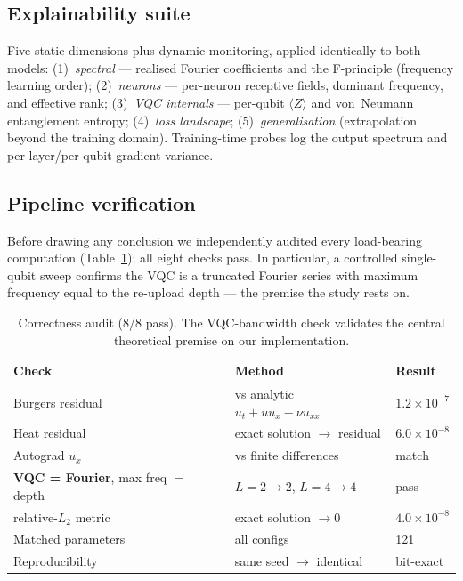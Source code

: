 \documentclass[11pt]{article}
\begin{document}
\subsection{Explainability suite}
Five static dimensions plus dynamic monitoring, applied identically to both models:
(1)~\emph{spectral} --- realised Fourier coefficients and the F-principle
(frequency learning order); (2)~\emph{neurons} --- per-neuron receptive fields,
dominant frequency, and effective rank; (3)~\emph{VQC internals} --- per-qubit
$\langle Z\rangle$ and von~Neumann entanglement entropy; (4)~\emph{loss landscape};
(5)~\emph{generalisation} (extrapolation beyond the training domain). Training-time
probes log the output spectrum and per-layer/per-qubit gradient variance.

\subsection{Pipeline verification}
Before drawing any conclusion we independently audited every load-bearing
computation (Table~\ref{tab:verify}); all eight checks pass. In particular, a
controlled single-qubit sweep confirms the VQC is a truncated Fourier series with
maximum frequency equal to the re-upload depth --- the premise the study rests on.

\begin{table}[t]
  \centering
  \small
  \begin{tabular}{lll}
    \toprule
    Check & Method & Result \\
    \midrule
    Burgers residual & vs analytic $u_t+u u_x-\nu u_{xx}$ & $1.2\times10^{-7}$ \\
    Heat residual & exact solution $\to$ residual & $6.0\times10^{-8}$ \\
    Autograd $u_x$ & vs finite differences & match \\
    \textbf{VQC = Fourier}, max freq $=$ depth & $L{=}2\!\to\!2$, $L{=}4\!\to\!4$ & pass \\
    relative-$L_2$ metric & exact solution $\to 0$ & $4.0\times10^{-8}$ \\
    Matched parameters & all configs & 121 \\
    Reproducibility & same seed $\to$ identical & bit-exact \\
    \bottomrule
  \end{tabular}
  \caption{Correctness audit (8/8 pass). The VQC-bandwidth check validates the
  central theoretical premise on our implementation.}
  \label{tab:verify}
\end{table}
\end{document}
